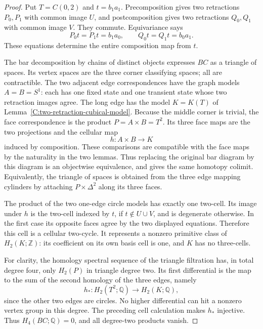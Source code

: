 \begin{proof}
Put $T=C(0,2)$ and $t=b_1a_1$.  Precomposition gives two
retractions $P_0,P_1$ with common image $U$, and postcomposition
gives two retractions $Q_0,Q_1$ with common image $V$.
They commute.  Equivariance says
\[
 P_0t=P_1t=b_1a_0,\qquad
 Q_0t=Q_1t=b_0a_1.
\]
These equations determine the entire composition map from $t$.

The bar decomposition by chains of distinct objects expresses
$BC$ as a triangle of spaces.  Its vertex spaces are the three
corner classifying spaces; all are contractible.  The two
adjacent edge correspondences have the graph models
$A=B=S^1$: each has one fixed state and one transient state
whose two retraction images agree.  The long edge has the
model $K=K(T)$ of Lemma~\ref{C:two-retraction-cubical-model}.
Because the middle corner is trivial, the face correspondence
is the product $P=A\times B=T^2$.  Its three face maps are
the two projections and the cellular map
\[
 h:A\times B\longrightarrow K
\]
induced by composition.  These comparisons are compatible
with the face maps by the naturality in the two lemmas.
Thus replacing the original bar diagram by this diagram is
an objectwise equivalence, and gives the same homotopy colimit.
Equivalently, the triangle of spaces is obtained from the
three edge mapping cylinders by attaching
$P\times\Delta^2$ along its three faces.

The product of the two one-edge circle models has exactly
one two-cell.  Its image under $h$ is the two-cell indexed
by $t$, if $t\notin U\cup V$, and is degenerate otherwise.
In the first case its opposite faces agree by the two
displayed equations.  Therefore this cell is a cellular
two-cycle.  It represents a nonzero primitive class of
$H_2(K;\mathbb Z)$: its coefficient on its own basis cell
is one, and $K$ has no three-cells.

For clarity, the homology spectral sequence of the triangle
filtration has, in total degree four, only
$H_2(P)$ in triangle degree two.  Its first differential is
the map to the sum of the second homology of the three edges,
namely
\[
 h_*:H_2(T^2;\mathbb Q)\longrightarrow H_2(K;\mathbb Q),
\]
since the other two edges are circles.  No higher differential
can hit a nonzero vertex group in this degree.  The preceding
cell calculation makes $h_*$ injective.  Thus
$H_4(BC;\mathbb Q)=0$, and all degree-two products vanish.


\end{proof}
